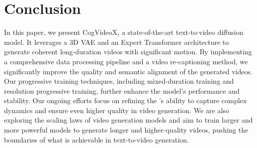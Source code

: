 \section{Conclusion}

In this paper, we present CogVideoX, a state-of-the-art text-to-video diffusion model. 
It leverages a 3D VAE and an Expert Transformer architecture to generate coherent long-duration videos with significant motion. 
By implementing a comprehensive data processing pipeline and a video re-captioning method, we significantly improve the quality and semantic alignment of the generated videos. 
Our progressive training techniques, including mixed-duration training and resolution progressive training, further enhance the model's performance and stability. 
Our ongoing efforts focus on refining the \model's ability to capture complex dynamics and ensure even higher quality in video generation. 
We are also exploring the scaling laws of video generation models and aim to train larger and more powerful models to generate longer and higher-quality videos, pushing the boundaries of what is achievable in text-to-video generation. 
